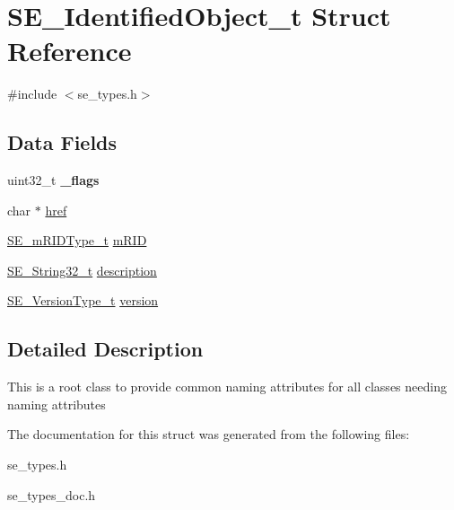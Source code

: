 \hypertarget{structSE__IdentifiedObject__t}{}\section{S\+E\+\_\+\+Identified\+Object\+\_\+t Struct Reference}
\label{structSE__IdentifiedObject__t}


{\ttfamily \#include $<$se\+\_\+types.\+h$>$}

\subsection*{Data Fields}
\begin{DoxyCompactItemize}
\item 
uint32\+\_\+t {\bfseries \+\_\+flags}
\item 
char $\ast$ \hyperlink{group__IdentifiedObject_gaa38c752b4716c2365e11d7afd8495be1}{href}
\item 
\hyperlink{group__mRIDType_gac74622112f3a388a2851b2289963ba5e}{S\+E\+\_\+m\+R\+I\+D\+Type\+\_\+t} \hyperlink{group__IdentifiedObject_ga2f6a112da8cb63840db553c07d6f5429}{m\+R\+ID}
\item 
\hyperlink{group__String32_gac9f59b06b168b4d2e0d45ed41699af42}{S\+E\+\_\+\+String32\+\_\+t} \hyperlink{group__IdentifiedObject_ga413d941623baaef9b40a6fb8dac29328}{description}
\item 
\hyperlink{group__VersionType_ga4b8d27838226948397ed99f67d46e2ae}{S\+E\+\_\+\+Version\+Type\+\_\+t} \hyperlink{group__IdentifiedObject_gaffcdf964702f132d4f4078cc4864d594}{version}
\end{DoxyCompactItemize}


\subsection{Detailed Description}
This is a root class to provide common naming attributes for all classes needing naming attributes 

The documentation for this struct was generated from the following files\+:\begin{DoxyCompactItemize}
\item 
se\+\_\+types.\+h\item 
se\+\_\+types\+\_\+doc.\+h\end{DoxyCompactItemize}
